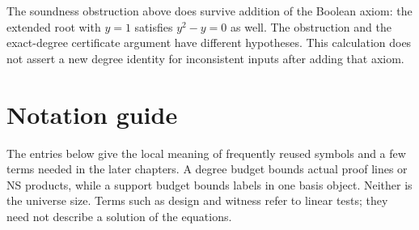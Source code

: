 \documentclass[11pt,a4paper,oneside,openany]{book}
\theoremstyle{definition}\newtheorem{definition}[theorem]{Definition}
\theoremstyle{remark}\newtheorem{remark}[theorem]{Remark}
\numberwithin{equation}{chapter}
\begin{document}
The soundness obstruction above does survive addition of the Boolean
axiom: the extended root with \(y=1\) satisfies \(y^2-y=0\) as well.
The obstruction and the exact-degree certificate argument have
different hypotheses. This calculation does not assert a new
degree identity for inconsistent inputs after adding that axiom.


\par


\section{Notation guide}
The entries below give the local meaning of frequently reused symbols
and a few terms needed in the later chapters. A degree budget bounds
actual proof lines or NS products, while a support budget bounds labels
in one basis object. Neither is the universe size. Terms such as design
and witness refer to linear tests; they need not describe a solution of
the equations.
\end{document}
